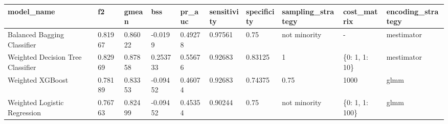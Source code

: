 \begin{tabular}{|l|l|l|l|l|l|l|l|l|l|}
\hline
\textbf{model\_name}              & \textbf{f2} & \textbf{gmean} & \textbf{bss} & \textbf{pr\_auc} & \textbf{sensitivity} & \textbf{specificity} & \textbf{sampling\_strategy} & \textbf{cost\_matrix} & \textbf{encoding\_strategy} \\ \hline
Balanced Bagging Classifier       & 0.81967     & 0.86022        & -0.0199      & 0.49278          & 0.97561              & 0.75                 & not minority                & -                     & mestimator                  \\ \hline
Weighted Decision Tree Classifier & 0.82969     & 0.87858        & 0.253733     & 0.55676          & 0.92683              & 0.83125              & 1                           & \{0: 1, 1: 10\}       & mestimator                  \\ \hline
Weighted XGBoost                  & 0.78189     & 0.83353        & -0.09452     & 0.46074          & 0.92683              & 0.74375              & 0.75                        & 1000                  & glmm                        \\ \hline
Weighted Logistic Regression      & 0.76763     & 0.82499        & -0.09452     & 0.45354          & 0.90244              & 0.75                 & not minority                & \{0: 1, 1: 100\}      & glmm                        \\ \hline
\end{tabular}